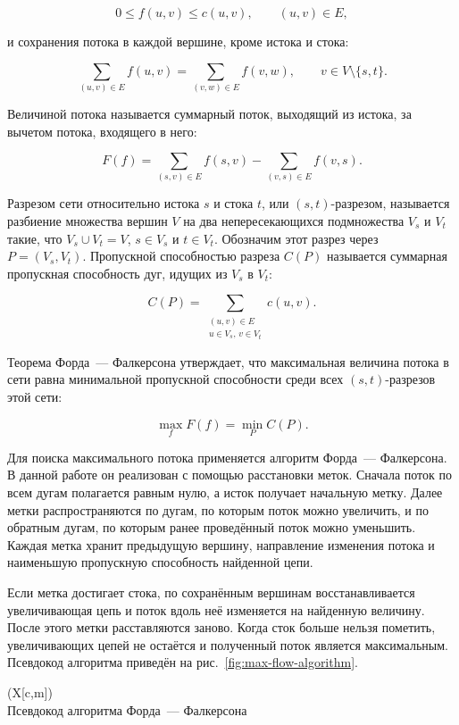 \[
0 \leq f(u,v) \leq c(u,v), \qquad (u,v)\in E,
\]

и сохранения потока в каждой вершине, кроме истока и стока:

\[
\sum_{(u,v)\in E} f(u,v)
=
\sum_{(v,w)\in E} f(v,w),
\qquad v\in V\setminus\{s,t\}.
\]

Величиной потока называется суммарный поток, выходящий из истока, за вычетом потока, входящего в него:

\[
F(f)=\sum_{(s,v)\in E}f(s,v)-\sum_{(v,s)\in E}f(v,s).
\]

Разрезом сети относительно истока $s$ и стока $t$, или $(s,t)$-разрезом, называется разбиение множества вершин $V$ на два непересекающихся подмножества $V_s$ и $V_t$ такие, что $V_s\cup V_t=V$, $s\in V_s$ и $t\in V_t$. Обозначим этот разрез через $P=(V_s,V_t)$. Пропускной способностью разреза $C(P)$ называется суммарная пропускная способность дуг, идущих из $V_s$ в $V_t$:

\[
C(P)=\sum_{\substack{(u,v)\in E\\u\in V_s,\,v\in V_t}}c(u,v).
\]

\begin{samepage}
Теорема Форда~--- Фалкерсона утверждает, что максимальная величина потока в сети равна минимальной пропускной способности среди всех $(s,t)$-разрезов этой сети:

\[
\max_f F(f)=\min_P C(P).
\]
\end{samepage}

Для поиска максимального потока применяется алгоритм Форда~--- Фалкерсона. В данной работе он реализован с помощью расстановки меток. Сначала поток по всем дугам полагается равным нулю, а исток получает начальную метку. Далее метки распространяются по дугам, по которым поток можно увеличить, и по обратным дугам, по которым ранее проведённый поток можно уменьшить. Каждая метка хранит предыдущую вершину, направление изменения потока и наименьшую пропускную способность найденной цепи.

Если метка достигает стока, по сохранённым вершинам восстанавливается увеличивающая цепь и поток вдоль неё изменяется на найденную величину. После этого метки расставляются заново. Когда сток больше нельзя пометить, увеличивающих цепей не остаётся и полученный поток является максимальным. Псевдокод алгоритма приведён на рис.~\ref{fig:max-flow-algorithm}.

\imgGrid[0pt](X[c,m]){
     \\
}{Псевдокод алгоритма Форда~--- Фалкерсона}{\label{fig:max-flow-algorithm}}

